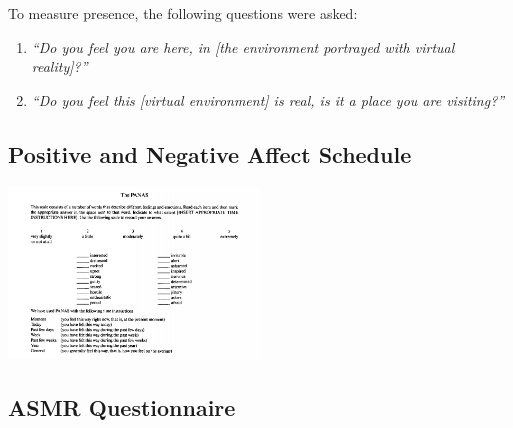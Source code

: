\documentclass{sigchi}
\newcommand{\inlinequote}[1]{\textit{``#1''}}
\begin{document}
To measure presence, the following questions were asked:
\begin{enumerate}
	\item{\inlinequote{Do you feel you are here, in [the environment portrayed with virtual reality]?}}
	\item{\inlinequote{Do you feel this [virtual environment] is real, is it a place you are visiting?}}
\end{enumerate}

\subsection{Positive and Negative Affect Schedule}
\includegraphics[width=0.5\textwidth]{questionnaires/ThePANAS.png}

\subsection{ASMR Questionnaire}

\end{document}
